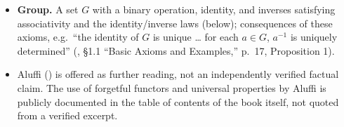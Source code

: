 \begin{itemize}
\tightlist
\item
  \textbf{Group.} A set \(G\) with a binary operation, identity, and inverses satisfying associativity and the identity/inverse laws (below); consequences of these axioms, e.g.~``the identity of \(G\) is unique \ldots{} for each \(a \in G\), \(a^{-1}\) is uniquely determined'' (\cite{DummitFoote2003}, §1.1 ``Basic Axioms and Examples,'' p.~17, Proposition 1).
\item
  Aluffi (\cite{Aluffi2009}) is offered as further reading, not an independently verified factual claim. The use of forgetful functors and universal properties by Aluffi is publicly documented in the table of contents of the book itself, not quoted from a verified excerpt.
\end{itemize}
